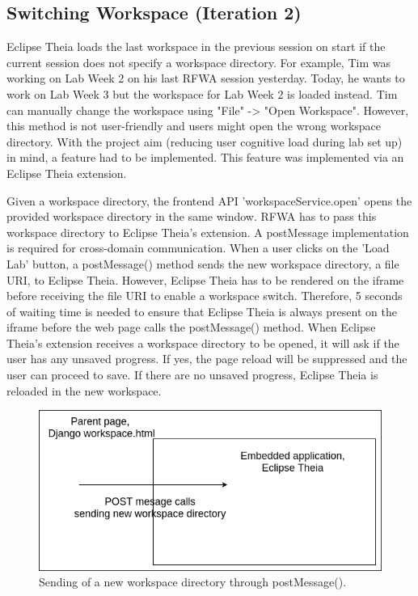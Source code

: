 \documentclass{l4proj}
\begin{document}
\subsection{Switching Workspace (Iteration 2)}

Eclipse Theia loads the last workspace in the previous session on start if the current session does not specify a workspace directory. For example, Tim was working on Lab Week 2 on his last RFWA session yesterday. Today, he wants to work on Lab Week 3 but the workspace for Lab Week 2 is loaded instead. Tim can manually change the workspace using "File" -> "Open Workspace". However, this method is not user-friendly and users might open the wrong workspace directory. With the project aim (reducing user cognitive load during lab set up) in mind, a feature had to be implemented. This feature was implemented via an Eclipse Theia extension. 

Given a workspace directory, the frontend API 'workspaceService.open' opens the provided workspace directory in the same window. RFWA has to pass this workspace directory to Eclipse Theia's extension. A postMessage implementation is required for cross-domain communication. When a user clicks on the 'Load Lab' button, a postMessage() method sends the new workspace directory, a file URI, to Eclipse Theia. However, Eclipse Theia has to be rendered on the iframe before receiving the file URI to enable a workspace switch. Therefore, 5 seconds of waiting time is needed to ensure that Eclipse Theia is always present on the iframe before the web page calls the postMessage() method. When Eclipse Theia's extension receives a workspace directory to be opened, it will ask if the user has any unsaved progress. If yes, the page reload will be suppressed and the user can proceed to save. If there are no unsaved progress, Eclipse Theia is reloaded in the new workspace.

\begin{figure}[h]
    \centering
    \includegraphics[scale=0.65]{images/postMessage_diagram.png}
    \caption{Sending of a new workspace directory through postMessage().}
    \label{fig:postMessage_implementation}
\end{figure}
\end{document}
